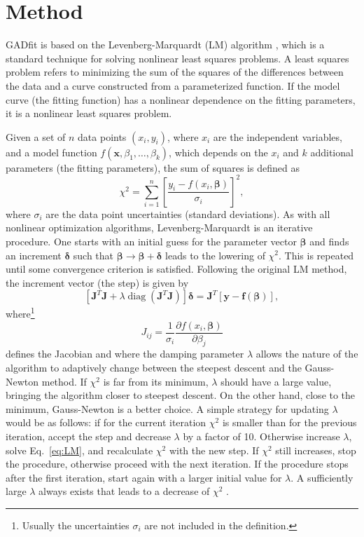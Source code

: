 \documentclass{article}
\DeclareMathOperator{\diag}{diag}
\begin{document}
\section{Method}

GADfit is based on the Levenberg-Marquardt (LM) algorithm \cite{marquardt63}, which is a standard technique for solving nonlinear least squares problems. A least squares problem refers to minimizing the sum of the squares of the differences between the data and a curve constructed from a parameterized function. If the model curve (the fitting function) has a nonlinear dependence on the fitting parameters, it is a nonlinear least squares problem.

Given a set of $n$ data points $(x_i,y_i)$, where $x_i$ are the independent variables, and a model function $f(\bm x, \beta_1, \ldots, \beta_k)$, which depends on the $x_i$ and $k$ additional parameters (the fitting parameters), the sum of squares is defined as
\begin{equation}
  \label{eq:chi2}
  \chi^2 = \sum_{i=1}^n \left[ \frac{y_i - f(x_i, \bm\beta)}{\sigma_i}
  \right]^2,
\end{equation}
where $\sigma_i$ are the data point uncertainties (standard deviations). As with all nonlinear optimization algorithms, Levenberg-Marquardt is an iterative procedure. One starts with an initial guess for the parameter vector $\bm\beta$ and finds an increment $\bm\delta$ such that $\bm\beta \rightarrow \bm\beta + \bm\delta$ leads to the lowering of $\chi^2$. This is repeated until some convergence criterion is satisfied. Following the original LM method, the increment vector (the step) is given by
\begin{equation}
  \label{eq:LM}
  \left[\bm J^T \bm J + \lambda\diag \left(\bm J^T \bm J\right)
  \right] \bm\delta = \bm J^T \left[ \bm y - \bm f(\bm \beta) \right],
\end{equation}
where\footnote{Usually the uncertainties $\sigma_i$ are not included in the
  definition.}
\begin{equation}
  \label{eq:Jacobian}
  J_{ij} = \frac{1}{\sigma_i} \frac{\partial f(x_i, \bm \beta)}
  {\partial \beta_j}
\end{equation}
defines the Jacobian and where the damping parameter $\lambda$ allows the nature of the algorithm to adaptively change between the steepest descent and the Gauss-Newton method. If $\chi^2$ is far from its minimum, $\lambda$ should have a large value, bringing the algorithm closer to steepest descent. On the other hand, close to the minimum, Gauss-Newton is a better choice. A simple strategy for updating $\lambda$ would be as follows: if for the current iteration $\chi^2$ is smaller than for the previous iteration, accept the step and decrease $\lambda$ by a factor of 10. Otherwise increase $\lambda$, solve Eq.~\eqref{eq:LM}, and recalculate $\chi^2$ with the new step. If $\chi^2$ still increases, stop the procedure, otherwise proceed with the next iteration. If the procedure stops after the first iteration, start again with a larger initial value for $\lambda$. A sufficiently large $\lambda$ always exists that leads to a decrease of $\chi^2$ \cite{marquardt63}.
\end{document}
